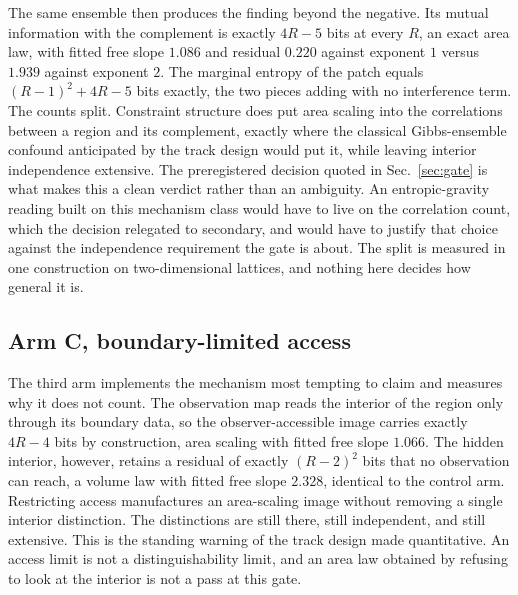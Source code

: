 \documentclass[aps,pre,reprint,nofootinbib]{revtex4-2}
\begin{document}
The same ensemble then produces the finding beyond the negative.  Its
mutual information with the complement is exactly $4R - 5$ bits at every
$R$, an exact area law, with fitted free slope $1.086$ and residual
$0.220$ against exponent $1$ versus $1.939$ against exponent $2$.  The
marginal entropy of the patch equals $(R-1)^2 + 4R - 5$ bits exactly, the
two pieces adding with no interference term.  The counts split.
Constraint structure does put area scaling into the correlations between
a region and its complement, exactly where the classical Gibbs-ensemble
confound anticipated by the track design would put it, while leaving
interior independence extensive.  The preregistered decision quoted in
Sec.~\ref{sec:gate} is what makes this a clean verdict rather than an
ambiguity.  An entropic-gravity reading built on this mechanism class
would have to live on the correlation count, which the decision relegated
to secondary, and would have to justify that choice against the
independence requirement the gate is about.  The split is measured in one construction
on two-dimensional lattices, and nothing here decides how general it is.

\subsection{Arm C, boundary-limited access}

The third arm implements the mechanism most tempting to claim and
measures why it does not count.  The observation map reads the interior
of the region only through its boundary data, so the observer-accessible
image carries exactly $4R - 4$ bits by construction, area scaling with
fitted free slope $1.066$.  The hidden interior, however, retains a
residual of exactly $(R-2)^2$ bits that no observation can reach, a
volume law with fitted free slope $2.328$, identical to the control arm.
Restricting access manufactures an area-scaling image without removing a
single interior distinction.  The distinctions are still there, still
independent, and still extensive.  This is the standing warning of the
track design made quantitative.  An access limit is not a
distinguishability limit, and an area law obtained by refusing to look at
the interior is not a pass at this gate.
\end{document}
